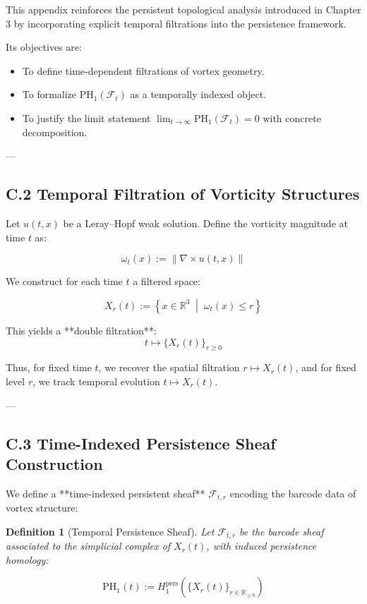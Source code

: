 \documentclass[11pt]{article}
\newtheorem{definition}[theorem]{Definition}
\begin{document}
This appendix reinforces the persistent topological analysis introduced in Chapter 3  
by incorporating explicit temporal filtrations into the persistence framework.

Its objectives are:

\begin{itemize}
  \item To define time-dependent filtrations of vortex geometry.
  \item To formalize \( \mathrm{PH}_1(\mathcal{F}_t) \) as a temporally indexed object.
  \item To justify the limit statement \( \lim_{t \to \infty} \mathrm{PH}_1(\mathcal{F}_t) = 0 \) with concrete decomposition.
\end{itemize}

---

\subsection*{C.2 Temporal Filtration of Vorticity Structures}

Let \( u(t,x) \) be a Leray–Hopf weak solution. Define the vorticity magnitude at time \( t \) as:

\[
\omega_t(x) := \| \nabla \times u(t,x) \|
\]

We construct for each time \( t \) a filtered space:

\[
X_r(t) := \left\{ x \in \mathbb{R}^3 \;\middle|\; \omega_t(x) \le r \right\}
\]

This yields a **double filtration**:
\[
t \mapsto \{ X_r(t) \}_{r \ge 0}
\]

Thus, for fixed time \( t \), we recover the spatial filtration \( r \mapsto X_r(t) \),  
and for fixed level \( r \), we track temporal evolution \( t \mapsto X_r(t) \).

---

\subsection*{C.3 Time-Indexed Persistence Sheaf Construction}

We define a **time-indexed persistent sheaf** \( \mathcal{F}_{t,r} \) encoding the barcode data of vortex structure:

\begin{definition}[Temporal Persistence Sheaf]
Let \( \mathcal{F}_{t,r} \) be the barcode sheaf associated to the simplicial complex of \( X_r(t) \),  
with induced persistence homology:

\[
\mathrm{PH}_1(t) := H_1^{\mathrm{pers}} \left( \{ X_r(t) \}_{r \in \mathbb{R}_{\ge 0}} \right)
\]
\end{definition}
\end{document}
